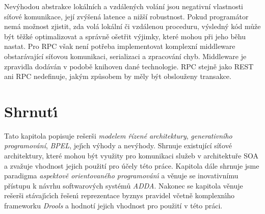 Nevýhodou abstrakce lokálních a vzdálených volání jsou
negativní vlastnosti síťové komunikace, její zvýšená latence
a nižší robustnost. Pokud programátor nemá možnost zjistit, zda volá
lokální či vzdálenou proceduru, výsledný kód může být těžké optimalizovat
a správně ošetřit výjimky, které mohou při jeho běhu nastat.
Pro \gls{RPC} však není potřeba implementovat komplexní middleware obstarávající
síťovou komunikaci, serializaci a zpracování chyb. Middleware je zpravidla dodáván v
podobě knihoven dané technologie. \gls{RPC} stejně jako \gls{REST}
ani \gls{RPC} nedefinuje, jakým způsobem by měly být obslouženy transakce.

\section{Shrnut\'{\i}}

Tato kapitola popisuje rešerši \textit{modelem řízené architektury},
\textit{generativního programování}, \textit{BPEL},
jej\'{\i}ch v\'yhody a nev\'yhody. Shrnuje existující síťové architektury,
které mohou být využity pro komunikaci služeb v architektuře \gls{SOA}
a zvažuje vhodnost jejich použití pro účely této práce.
Kapitola dále shrnuje jsme paradigma \textit{aspektově orientovaného programován\'{\i}} a
věnuje se inovativnímu přístupu k návrhu softwarov\'ych systémů \textit{ADDA}.
Nakonec se kapitola věnuje rešerši stávaj\'{\i}c\'{\i}ch řešen\'{\i} reprezentace byznys pravidel
včetně komplexn\'{\i}ho frameworku \textit{Drools} a hodnotí jejich vhodnost pro použití v této práci.
